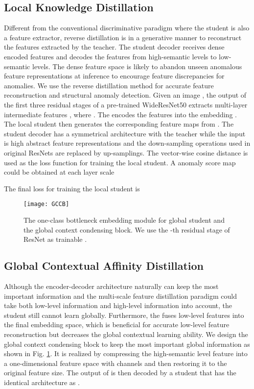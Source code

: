 \documentclass[10pt,twocolumn,letterpaper]{article}
\begin{document}
\subsection{Local Knowledge Distillation}
Different from the conventional discriminative paradigm where the student is also a feature extractor, reverse distillation \cite{deng2022anomaly} is in a generative manner to reconstruct the features extracted by the teacher. The student decoder receives dense encoded features and decodes the features from high-semantic levels to low-semantic levels. The dense feature space is likely to abandon unseen anomalous feature representations at inference to encourage feature discrepancies for anomalies. We use the reverse distillation \cite{deng2022anomaly} method for accurate feature reconstruction and structural anomaly detection.
Given an image , the output of the first three residual stages of a pre-trained WideResNet50 \cite{zagoruyko2016wide}  extracts multi-layer intermediate features , where . The  encodes the features into the embedding  . The local student  then generates the corresponding feature maps  from . The student decoder has a symmetrical architecture with the teacher  while the input is high abstract feature representations and the down-sampling operations used in original ResNets \cite{he2016deep} are replaced by up-samplings. The vector-wise cosine distance is used as the loss function for training the local student. A  anomaly score map could be obtained at each layer scale  

The final loss for training the local student is 





\begin{figure}[t]
  \centering
   \texttt{[image: GCCB]}

   \caption{The one-class bottleneck embedding module for global student and the global context condensing block. We use the -th residual stage of ResNet as trainable .}
   \label{fig_gccb}
\end{figure}


\subsection{Global Contextual Affinity Distillation}
Although the encoder-decoder architecture naturally can keep the most important information and the multi-scale feature distillation paradigm could take both low-level information and high-level information into account, the student still cannot learn globally. Furthermore, the  fuses low-level features into the final embedding space, which is beneficial for accurate low-level feature reconstruction but decreases the global contextual learning ability. We design the global context condensing block to keep the most important global information as shown in Fig. \ref{fig_gccb}. It is realized by compressing the high-semantic level feature  into a one-dimensional feature space with  channels and then restoring it to the original feature size. The output  of  is then decoded by a student  that has the identical architecture as .
\end{document}
